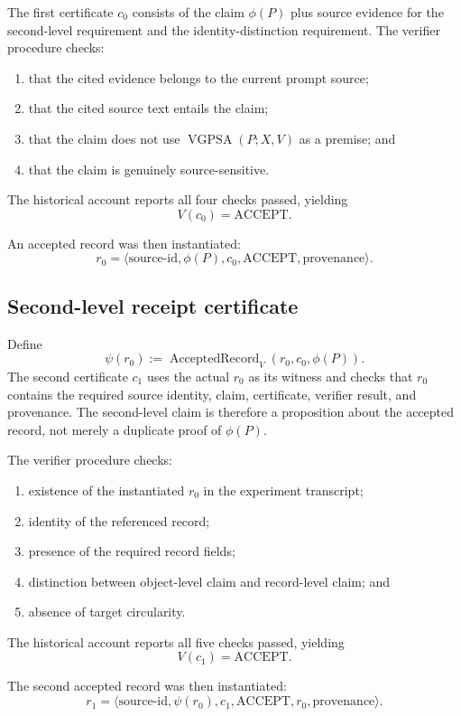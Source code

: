\documentclass[11pt]{article}
\theoremstyle{remark}
\newcommand{\VGPSA}{\operatorname{VGPSA}}
\newcommand{\Acc}{\operatorname{AcceptedRecord}}
\begin{document}
The first certificate $c_0$ consists of the claim $\phi(P)$ plus source evidence for the second-level requirement and the identity-distinction requirement. The verifier procedure checks:
\begin{enumerate}[label=(V0.\arabic*)]
\item that the cited evidence belongs to the current prompt source;
\item that the cited source text entails the claim;
\item that the claim does not use $\VGPSA(P;X,V)$ as a premise; and
\item that the claim is genuinely source-sensitive.
\end{enumerate}
The historical account reports all four checks passed, yielding
\[
V(c_0)=\mathrm{ACCEPT}.
\]

An accepted record was then instantiated:
\[
r_0=\langle \text{source-id},\phi(P),c_0,\mathrm{ACCEPT},\text{provenance}\rangle.
\]

\subsection{Second-level receipt certificate}

Define
\[
\psi(r_0):=\Acc_V(r_0,c_0,\phi(P)).
\]
The second certificate $c_1$ uses the actual $r_0$ as its witness and checks that $r_0$ contains the required source identity, claim, certificate, verifier result, and provenance. The second-level claim is therefore a proposition about the accepted record, not merely a duplicate proof of $\phi(P)$.

The verifier procedure checks:
\begin{enumerate}[label=(V1.\arabic*)]
\item existence of the instantiated $r_0$ in the experiment transcript;
\item identity of the referenced record;
\item presence of the required record fields;
\item distinction between object-level claim and record-level claim; and
\item absence of target circularity.
\end{enumerate}
The historical account reports all five checks passed, yielding
\[
V(c_1)=\mathrm{ACCEPT}.
\]

The second accepted record was then instantiated:
\[
r_1=\langle \text{source-id},\psi(r_0),c_1,\mathrm{ACCEPT},r_0,\text{provenance}\rangle.
\]
\end{document}
